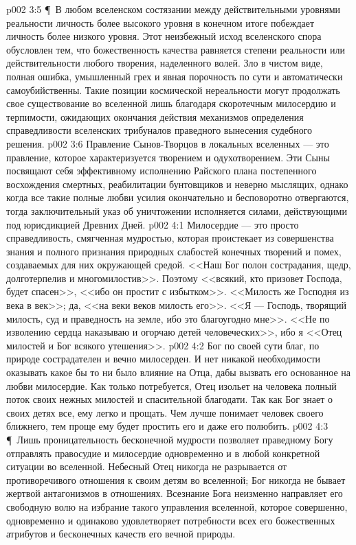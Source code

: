 \vs p002 3:5 \P\ В любом вселенском состязании между действительными уровнями реальности личность более высокого уровня в конечном итоге побеждает личность более низкого уровня. Этот неизбежный исход вселенского спора обусловлен тем, что божественность качества равняется степени реальности или действительности любого творения, наделенного волей. Зло в чистом виде, полная ошибка, умышленный грех и явная порочность по сути и автоматически самоубийственны. Такие позиции космической нереальности могут продолжать свое существование во вселенной лишь благодаря скоротечным милосердию и терпимости, ожидающих окончания действия механизмов определения справедливости вселенских трибуналов праведного вынесения судебного решения.
\vs p002 3:6 Правление Сынов\hyp{}Творцов в локальных вселенных --- это правление, которое характеризуется творением и одухотворением. Эти Сыны посвящают себя эффективному исполнению Райского плана постепенного восхождения смертных, реабилитации бунтовщиков и неверно мыслящих, однако когда все такие полные любви усилия окончательно и бесповоротно отвергаются, тогда заключительный указ об уничтожении исполняется силами, действующими под юрисдикцией Древних Дней.
\vs p002 4:1 Милосердие --- это просто справедливость, смягченная мудростью, которая проистекает из совершенства знания и полного признания природных слабостей конечных творений и помех, создаваемых для них окружающей средой. <<Наш Бог полон сострадания, щедр, долготерпелив и многомилостив>>. Поэтому <<всякий, кто призовет Господа, будет спасен>>, <<ибо он простит с избытком>>. <<Милость же Господня из века в век>>; да, <<на веки веков милость его>>. <<Я --- Господь, творящий милость, суд и праведность на земле, ибо это благоугодно мне>>. <<Не по изволению сердца наказываю и огорчаю детей человеческих>>, ибо я <<Отец милостей и Бог всякого утешения>>.
\vs p002 4:2 Бог по своей сути благ, по природе сострадателен и вечно милосерден. И нет никакой необходимости оказывать какое бы то ни было влияние на Отца, дабы вызвать его основанное на любви милосердие. Как только потребуется, Отец изольет на человека полный поток своих нежных милостей и спасительной благодати. Так как Бог знает о своих детях все, ему легко и прощать. Чем лучше понимает человек своего ближнего, тем проще ему будет простить его и даже его полюбить.
\vs p002 4:3 \P\ Лишь проницательность бесконечной мудрости позволяет праведному Богу отправлять правосудие и милосердие одновременно и в любой конкретной ситуации во вселенной. Небесный Отец никогда не разрывается от противоречивого отношения к своим детям во вселенной; Бог никогда не бывает жертвой антагонизмов в отношениях. Всезнание Бога неизменно направляет его свободную волю на избрание такого управления вселенной, которое совершенно, одновременно и одинаково удовлетворяет потребности всех его божественных атрибутов и бесконечных качеств его вечной природы.
